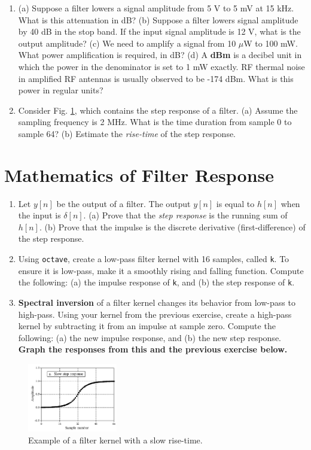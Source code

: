 \documentclass{article}
\begin{document}
\begin{enumerate}
\item (a) Suppose a filter lowers a signal amplitude from 5 V to 5 mV at 15 kHz.  What is this attenuation in dB? (b) Suppose a filter lowers signal amplitude by 40 dB in the stop band.  If the input signal amplitude is 12 V, what is the output amplitude? (c) We need to amplify a signal from 10 $\mu$W to 100 mW.  What power amplification is required, in dB? (d) A \textbf{dBm} is a decibel unit in which the power in the denominator is set to 1 mW exactly.  RF thermal noise in amplified RF antennas is usually observed to be -174 dBm.  What is this power in regular units? \\ \vspace{2.5cm}
\item Consider Fig. \ref{fig:1}, which contains the step response of a filter.  (a) Assume the sampling frequency is 2 MHz.  What is the time duration from sample 0 to sample 64? (b) Estimate the \textit{rise-time} of the step response. \\ \vspace{1cm}
\end{enumerate}

\section{Mathematics of Filter Response}

\begin{enumerate}
\item Let $y[n]$ be the output of a filter.  The output $y[n]$ is equal to $h[n]$ when the input is $\delta[n]$.  (a) Prove that the \textit{step response} is the running sum of $h[n]$. (b) Prove that the impulse is the discrete derivative (first-difference) of the step response. \\ \vspace{2.5cm}
\item Using \verb+octave+, create a low-pass filter kernel with 16 samples, called \verb+k+. To ensure it is low-pass, make it a smoothly rising and falling function.  Compute the following: (a) the impulse response of \verb+k+, and (b) the step response of \verb+k+.
\item \textbf{Spectral inversion} of a filter kernel changes its behavior from low-pass to high-pass.  Using your kernel from the previous exercise, create a high-pass kernel by subtracting it from an impulse at sample zero. Compute the following: (a) the new impulse response, and (b) the new step response.  \textbf{Graph the responses from this and the previous exercise below.}
\end{enumerate}

\begin{figure}
\centering
\includegraphics[width=0.35\textwidth]{step.png}
\caption{\label{fig:1} Example of a filter kernel with a slow rise-time.}
\end{figure}
\end{document}
